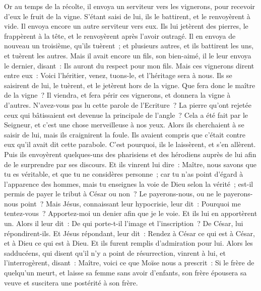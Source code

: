 \begin{multicols}{2}
Or au temps de la récolte, il envoya un serviteur vers les vignerons, pour recevoir d'eux le fruit de la vigne.
S'étant saisi de lui, ils le battirent, et le renvoyèrent à vide.
Il envoya encore un autre serviteur vers eux. Ils lui jetèrent des pierres, le frappèrent à la tête, et le renvoyèrent après l'avoir outragé.
Il en envoya de nouveau un troisième, qu'ils tuèrent~; et plusieurs autres, et ils battirent les uns, et tuèrent les autres.
Mais il avait encore un fils, son bien-aimé, il le leur envoya le dernier, disant~: Ils auront du respect pour mon fils.
Mais ces vignerons dirent entre eux~: Voici l'héritier, venez, tuons-le, et l'héritage sera à nous.
Ils se saisirent de lui, le tuèrent, et le jetèrent hors de la vigne.
Que fera donc le maître de la vigne~? Il viendra, et fera périr ces vignerons, et donnera la vigne à d'autres.
N'avez-vous pas lu cette parole de l'Ecriture~? La pierre qu'ont rejetée ceux qui bâtissaient est devenue la principale de l'angle~?
Cela a été fait par le Seigneur, et c'est une chose merveilleuse à nos yeux.
Alors ils cherchaient à se saisir de lui, mais ils craignirent la foule. Ils avaient compris que c'était contre eux qu'il avait dit cette parabole. C'est pourquoi, ils le laissèrent, et s'en allèrent.
Puis ils envoyèrent quelques-uns des pharisiens et des hérodiens auprès de lui afin de le surprendre par ses discours.
Et ils vinrent lui dire~: Maître, nous savons que tu es véritable, et que tu ne considères personne~; car tu n'as point d'égard à l'apparence des hommes, mais tu enseignes la voie de Dieu selon la vérité~; est-il permis de payer le tribut à César ou non~? Le payerons-nous, ou ne le payerons-nous point~?
Mais Jésus, connaissant leur hypocrisie, leur dit~: Pourquoi me tentez-vous~? Apportez-moi un denier afin que je le voie.
Et ils lui en apportèrent un. Alors il leur dit~: De qui porte-t-il l'image et l'inscription~? De César, lui répondirent-ils.
Et Jésus répondant, leur dit~: Rendez à César ce qui est à César, et à Dieu ce qui est à Dieu. Et ils furent remplis d'admiration pour lui.
Alors les sadducéens, qui disent qu'il n'y a point de résurrection, vinrent à lui, et l'interrogèrent, disant~:
Maître, voici ce que Moïse nous a prescrit~: Si le frère de quelqu'un meurt, et laisse sa femme sans avoir d'enfants, son frère épousera sa veuve et suscitera une postérité à son frère.

\end{multicols}
